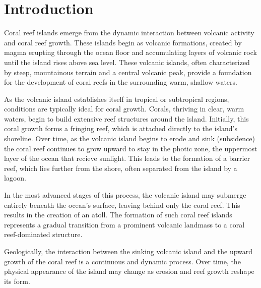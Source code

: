 \minitoc

\section{Introduction}
\label{sec:coral-island_introduction}

Coral reef islands emerge from the dynamic interaction between volcanic activity and coral reef growth. These islands begin as volcanic formations, created by magma erupting through the ocean floor and accumulating layers of volcanic rock until the island rises above sea level. These volcanic islands, often characterized by steep, mountainous terrain and a central volcanic peak, provide a foundation for the development of coral reefs in the surrounding warm, shallow waters.

As the volcanic island establishes itself in tropical or subtropical regions, conditions are typically ideal for coral growth. Corals, thriving in clear, warm waters, begin to build extensive reef structures around the island. Initially, this coral growth forms a fringing reef, which is attached directly to the island's shoreline. Over time, as the volcanic island begins to erode and sink (subsidence) the coral reef continues to grow upward to stay in the photic zone, the uppermost layer of the ocean that recieve sunlight. This leads to the formation of a barrier reef, which lies further from the shore, often separated from the island by a lagoon.

In the most advanced stages of this process, the volcanic island may submerge entirely beneath the ocean's surface, leaving behind only the coral reef. This results in the creation of an atoll. The formation of such coral reef islands represents a gradual transition from a prominent volcanic landmass to a coral reef-dominated structure. 

Geologically, the interaction between the sinking volcanic island and the upward growth of the coral reef is a continuous and dynamic process. Over time, the physical appearance of the island may change as erosion and reef growth reshape its form.


